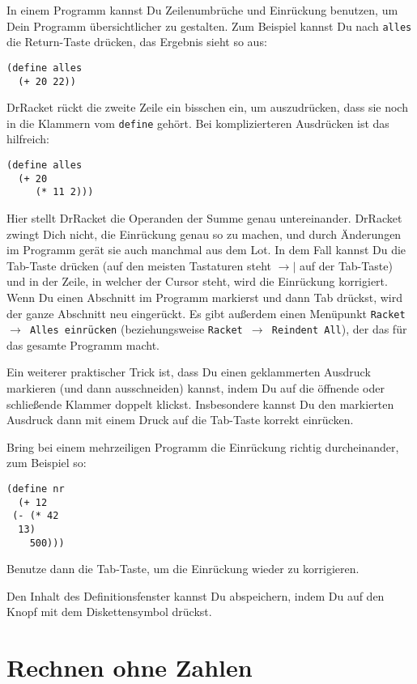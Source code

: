 In einem Programm kannst Du Zeilenumbrüche und Einrückung benutzen, um
Dein Programm übersichtlicher zu gestalten.  Zum Beispiel kannst Du
nach \lstinline{alles} die Return-Taste drücken, das Ergebnis sieht so
aus:
%
\begin{lstlisting}
(define alles
  (+ 20 22))
\end{lstlisting}
%
DrRacket rückt die zweite Zeile ein bisschen ein, um auszudrücken,
dass sie noch in die Klammern vom \lstinline{define} gehört.  Bei
komplizierteren Ausdrücken ist das hilfreich:
%
\begin{lstlisting}
(define alles
  (+ 20
     (* 11 2)))
\end{lstlisting}
%
Hier stellt DrRacket die Operanden der Summe genau untereinander.
DrRacket zwingt Dich nicht, die Einrückung genau so zu machen, und
durch Änderungen im Programm gerät sie auch manchmal aus dem Lot.  In
dem Fall kannst Du die Tab-Taste drücken (auf den meisten Tastaturen
steht $\longrightarrow\mid$ auf der Tab-Taste) und in der Zeile, in
welcher der Cursor steht, wird die Einrückung korrigiert.
Wenn Du einen Abschnitt im Programm markierst und dann Tab drückst,
wird der ganze Abschnitt neu eingerückt.  
Es gibt
außerdem einen Menüpunkt \texttt{Racket $\rightarrow$ Alles einrücken} (beziehungsweise
\texttt{Racket $\rightarrow$ Reindent All}), der das für das gesamte
Programm macht.

Ein weiterer praktischer Trick ist, dass Du einen geklammerten
Ausdruck markieren (und dann ausschneiden) kannst, indem Du auf die
öffnende oder schließende Klammer doppelt klickst.  Insbesondere
kannst Du den markierten Ausdruck dann mit einem Druck auf die
Tab-Taste korrekt einrücken.

\begin{aufgabeinline}
  Bring bei einem mehrzeiligen Programm die Einrückung richtig
  durcheinander, zum Beispiel so:
\begin{lstlisting}
(define nr
  (+ 12
 (- (* 42
  13)
    500)))
\end{lstlisting}
  Benutze dann die Tab-Taste, um die Einrückung wieder zu korrigieren.
\end{aufgabeinline}
%
Den Inhalt des Definitionsfenster kannst Du abspeichern, indem Du auf
den Knopf mit dem Diskettensymbol
 drückst.

\section{Rechnen ohne Zahlen}

